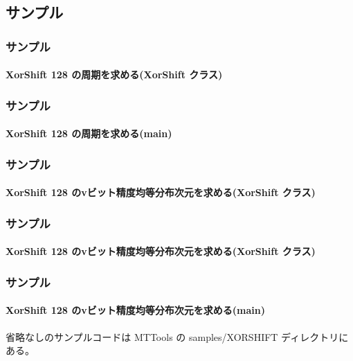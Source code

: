 \documentclass[cjk, dvips, handout, trans, xcolor=dvipsnames, hyperref={bookmarks=false}]{beamer}
\begin{document}
\subsection{サンプル}
\begin{frame}[t]
  \frametitle{サンプル}
  \framesubtitle{XorShift 128 の周期を求める(XorShift クラス)}
%  
  
\end{frame}

\begin{frame}[t]
  \frametitle{サンプル}
  \framesubtitle{XorShift 128 の周期を求める(main)}
%  
  
\end{frame}

\begin{frame}[t]
  \frametitle{サンプル}
  \framesubtitle{XorShift 128 のvビット精度均等分布次元を求める(XorShift クラス)}
%  
  
\end{frame}

\begin{frame}[t]
  \frametitle{サンプル}
  \framesubtitle{XorShift 128 のvビット精度均等分布次元を求める(XorShift クラス)}
%  
  
\end{frame}

\begin{frame}[t]
  \frametitle{サンプル}
  \framesubtitle{XorShift 128 のvビット精度均等分布次元を求める(main)}
%  
  

  \pause
  \vspace{\baselineskip}
  省略なしのサンプルコードは MTTools の samples/XORSHIFT ディレクトリにある。
\end{frame}
\end{document}
